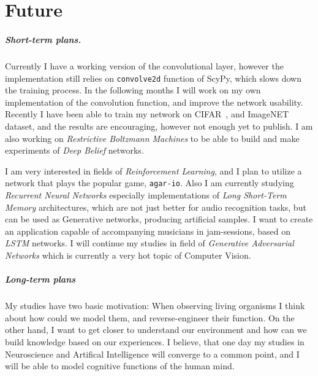 \chapter{Future}

\paragraph{Short-term plans.} 
Currently I have a working version of the convolutional layer, 
however the implementation still relies on \texttt{convolve2d} function of ScyPy, which slows down the training process.
In the following months I will work on my own implementation of the convolution function, 
and improve the network usability.
Recently I have been able to train my network on CIFAR~\cite{cifar}, and ImageNET~\cite{deng2009imagenet} dataset, and the results are encouraging, however not enough yet to publish.
I am also working on \emph{Restrictive Boltzmann Machines} to be able to build and make experiments of \emph{Deep Belief} networks.

I am very interested in fields of \emph{Reinforcement Learning}, 
and I plan to utilize a network that plays the popular game, \texttt{agar-io}.
Also I am currently studying \emph{Recurrent Neural Networks} especially implementations of \emph{Long Short-Term Memory} architectures, 
which are not just better for audio recognition tasks, but can be used as Generative networks, producing artificial samples.
I want to create an application capable of accompanying musicians in jam-sessions, based on \emph{LSTM} networks.
I will continue my studies in field of \emph{Generative Adversarial Networks} which is currently a very hot topic of Computer Vision.

\paragraph{Long-term plans}
My studies have two basic motivation:
When observing living organisms I think about how could we model them, 
and reverse-engineer their function. 
On the other hand, I want to get closer to understand our 
environment and how can we build knowledge based on our experiences.
I believe, that one day my studies in Neuroscience and Artifical Intelligence will converge to a common point, and I will be able to model cognitive functions of the human mind.

